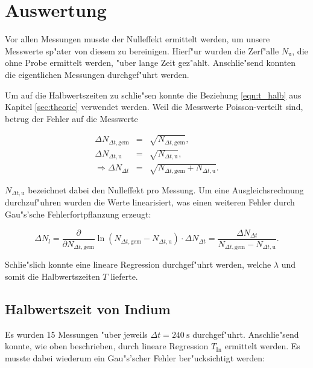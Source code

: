 \section{Auswertung}
	\label{sec:auswertung}
	Vor allen Messungen musste der Nulleffekt ermittelt werden, um unsere Messwerte sp"ater von diesem zu bereinigen.
	Hierf"ur wurden die Zerf"alle $N_{\mathrm{u}}$, die ohne Probe ermittelt werden, "uber lange Zeit gez"ahlt.
	Anschlie"send konnten die eigentlichen Messungen durch\-ge\-f"uhrt werden.
	

	Um auf die Halbwertszeiten zu schlie"sen konnte die Beziehung \eqref{eqn:t_halb} aus Kapitel \ref{sec:theorie} verwendet werden.
	Weil die Messwerte Poisson-verteilt sind, betrug der Fehler auf die Messwerte

	\begin{eqnarray*}
		\Delta N_{\Delta t, \mathrm{gem}} & = & \sqrt{N_{\Delta t, \mathrm{gem}}}, \\
		\Delta N_{\Delta t, \mathrm{u}} & = & \sqrt{N_{\Delta t, \mathrm{u}}},\\
		\Rightarrow \Delta N_{\Delta t} & = & \sqrt{N_{\Delta t, \mathrm{gem}} + N_{\Delta t, \mathrm{u}}} .
	\end{eqnarray*}

	$N_{\Delta t, \mathrm{u}}$ bezeichnet dabei den Nulleffekt pro Messung.
	Um eine Ausgleichsrechnung durchzuf"uhren wurden die Werte linearisiert, was einen weiteren Fehler durch Gau"s'sche Fehlerfortpflanzung erzeugt:

	\begin{equation*}
		\Delta N_{l} = \frac{\partial}{\partial N_{\Delta t, \mathrm{gem}}} \ln{\left( N_{\Delta t, \mathrm{gem}} - N_{\Delta t, \mathrm{u}} \right)} \cdot \Delta N_{\Delta t} = \frac{\Delta N_{\Delta t}}{N_{\Delta t, \mathrm{gem}} - N_{\Delta t, \mathrm{u}}} .
	\end{equation*}

	Schlie"slich konnte eine lineare Regression durchgef"uhrt werden, welche $\lambda$ und somit die Halbwertszeiten $T$ lieferte.

	\subsection{Halbwertszeit von Indium}
		\label{subsec:indium}
		Es wurden 15 Messungen "uber jeweils $\Delta t = \SI{240}{\second}$ durchgef"uhrt.
		Anschlie"send konnte, wie oben beschrieben, durch lineare Regression $T_\mathrm{In}$ ermittelt werden. Es musste dabei wiederum ein Gau"s'scher Fehler ber"ucksichtigt werden:

